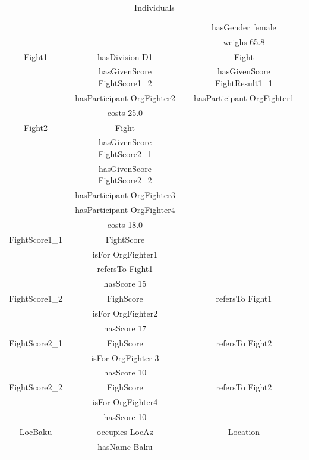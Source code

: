 \documentclass[a4paper]{article}
\begin{document}
\begin{appendix}
\begin{table}[H]
\begin{tabular}{|c|c|c|}
				& & hasGender female \\
				& & weighs 65.8 \\
			\hline
			Fight1 & hasDivision D1 & Fight \\
				& hasGivenScore FightScore1\_2 & hasGivenScore FightResult1\_1 \\
				& hasParticipant OrgFighter2 & hasParticipant OrgFighter1 \\
				& costs 25.0 & \\
			\hline
			Fight2 & Fight & \\
				& hasGivenScore FightScore2\_1 & \\
				& hasGivenScore FightScore2\_2 & \\
				& hasParticipant OrgFighter3 & \\
				& hasParticipant OrgFighter4 & \\
				& costs 18.0 & \\
			\hline
			FightScore1\_1 & FightScore & \\
				& isFor OrgFighter1 & \\
				& refersTo Fight1 & \\
				& hasScore 15 & \\
			\hline
			FightScore1\_2 & FighScore & refersTo Fight1 \\
				& isFor OrgFighter2 & \\
				& hasScore 17 & \\
			\hline
			FightScore2\_1 & FighScore & refersTo Fight2 \\
				& isFor OrgFighter 3 & \\
				& hasScore 10 & \\
			\hline
			FightScore2\_2 & FighScore & refersTo Fight2 \\
				& isFor OrgFighter4 & \\
				& hasScore 10 & \\
			\hline
			LocBaku & occupies LocAz & Location \\
				& hasName Baku & \\
			\hline
		\end{tabular}
		\caption{Individuals}
		\label{tab:all_individuals}
	\end{table}


\end{appendix}
\end{document}
